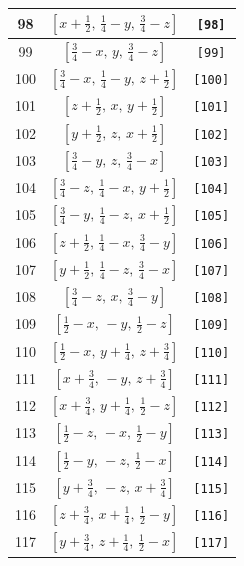 \documentclass[fleqn,8pt]{jsarticle}
\begin{document}
\begin{longtable}{ccc}
98 & $\left[ x + \frac{1}{2},\, \frac{1}{4} - y,\, \frac{3}{4} - z \right]$ & {\tt [98]} \\ \hline
99 & $\left[ \frac{3}{4} - x,\, y,\, \frac{3}{4} - z \right]$ & {\tt [99]} \\ \hline
100 & $\left[ \frac{3}{4} - x,\, \frac{1}{4} - y,\, z + \frac{1}{2} \right]$ & {\tt [100]} \\ \hline
101 & $\left[ z + \frac{1}{2},\, x,\, y + \frac{1}{2} \right]$ & {\tt [101]} \\ \hline
102 & $\left[ y + \frac{1}{2},\, z,\, x + \frac{1}{2} \right]$ & {\tt [102]} \\ \hline
103 & $\left[ \frac{3}{4} - y,\, z,\, \frac{3}{4} - x \right]$ & {\tt [103]} \\ \hline
104 & $\left[ \frac{3}{4} - z,\, \frac{1}{4} - x,\, y + \frac{1}{2} \right]$ & {\tt [104]} \\ \hline
105 & $\left[ \frac{3}{4} - y,\, \frac{1}{4} - z,\, x + \frac{1}{2} \right]$ & {\tt [105]} \\ \hline
106 & $\left[ z + \frac{1}{2},\, \frac{1}{4} - x,\, \frac{3}{4} - y \right]$ & {\tt [106]} \\ \hline
107 & $\left[ y + \frac{1}{2},\, \frac{1}{4} - z,\, \frac{3}{4} - x \right]$ & {\tt [107]} \\ \hline
108 & $\left[ \frac{3}{4} - z,\, x,\, \frac{3}{4} - y \right]$ & {\tt [108]} \\ \hline
109 & $\left[ \frac{1}{2} - x,\, - y,\, \frac{1}{2} - z \right]$ & {\tt [109]} \\ \hline
110 & $\left[ \frac{1}{2} - x,\, y + \frac{1}{4},\, z + \frac{3}{4} \right]$ & {\tt [110]} \\ \hline
111 & $\left[ x + \frac{3}{4},\, - y,\, z + \frac{3}{4} \right]$ & {\tt [111]} \\ \hline
112 & $\left[ x + \frac{3}{4},\, y + \frac{1}{4},\, \frac{1}{2} - z \right]$ & {\tt [112]} \\ \hline
113 & $\left[ \frac{1}{2} - z,\, - x,\, \frac{1}{2} - y \right]$ & {\tt [113]} \\ \hline
114 & $\left[ \frac{1}{2} - y,\, - z,\, \frac{1}{2} - x \right]$ & {\tt [114]} \\ \hline
115 & $\left[ y + \frac{3}{4},\, - z,\, x + \frac{3}{4} \right]$ & {\tt [115]} \\ \hline
116 & $\left[ z + \frac{3}{4},\, x + \frac{1}{4},\, \frac{1}{2} - y \right]$ & {\tt [116]} \\ \hline
117 & $\left[ y + \frac{3}{4},\, z + \frac{1}{4},\, \frac{1}{2} - x \right]$ & {\tt [117]} \\ \hline

\end{longtable}
\end{document}
